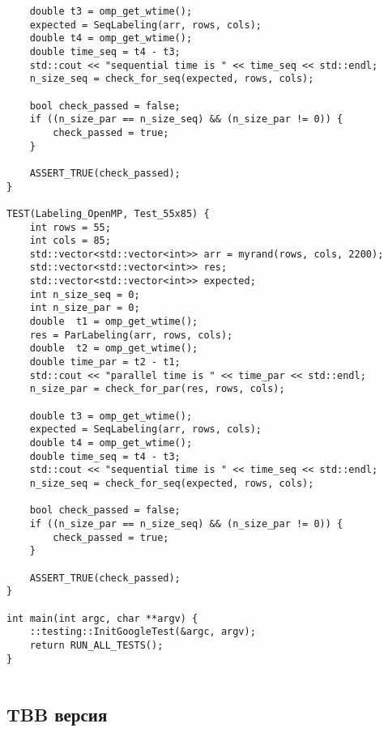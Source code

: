 \documentclass{report}
\begin{document}
\begin{lstlisting}
    double t3 = omp_get_wtime();
    expected = SeqLabeling(arr, rows, cols);
    double t4 = omp_get_wtime();
    double time_seq = t4 - t3;
    std::cout << "sequential time is " << time_seq << std::endl;
    n_size_seq = check_for_seq(expected, rows, cols);

    bool check_passed = false;
    if ((n_size_par == n_size_seq) && (n_size_par != 0)) {
        check_passed = true;
    }

    ASSERT_TRUE(check_passed);
}

TEST(Labeling_OpenMP, Test_55x85) {
    int rows = 55;
    int cols = 85;
    std::vector<std::vector<int>> arr = myrand(rows, cols, 2200);
    std::vector<std::vector<int>> res;
    std::vector<std::vector<int>> expected;
    int n_size_seq = 0;
    int n_size_par = 0;
    double  t1 = omp_get_wtime();
    res = ParLabeling(arr, rows, cols);
    double  t2 = omp_get_wtime();
    double time_par = t2 - t1;
    std::cout << "parallel time is " << time_par << std::endl;
    n_size_par = check_for_par(res, rows, cols);

    double t3 = omp_get_wtime();
    expected = SeqLabeling(arr, rows, cols);
    double t4 = omp_get_wtime();
    double time_seq = t4 - t3;
    std::cout << "sequential time is " << time_seq << std::endl;
    n_size_seq = check_for_seq(expected, rows, cols);

    bool check_passed = false;
    if ((n_size_par == n_size_seq) && (n_size_par != 0)) {
        check_passed = true;
    }

    ASSERT_TRUE(check_passed);
}

int main(int argc, char **argv) {
    ::testing::InitGoogleTest(&argc, argv);
    return RUN_ALL_TESTS();
}


\end{lstlisting}

\subsection{TBB версия}
\end{document}
